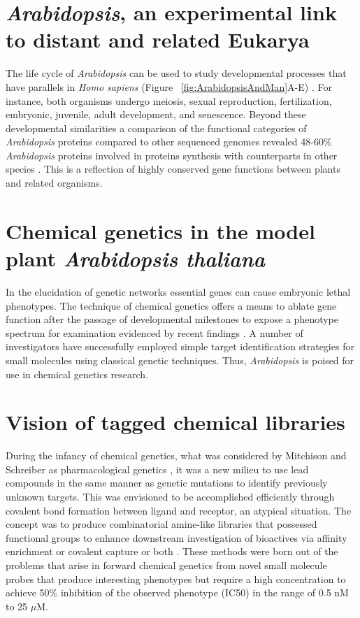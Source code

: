\section{{\it Arabidopsis}, an experimental link to distant and related Eukarya}

The life cycle of {\it Arabidopsis} can be used to study developmental processes that have parallels in {\it Homo sapiens} (Figure ~\ref{fig:ArabidopsisAndMan}A-E) \cite{boyes2001growth}. For instance, both organisms undergo meiosis, sexual reproduction, fertilization, embryonic, juvenile, adult development, and senescence. Beyond these developmental similarities a comparison of the functional categories of {\it Arabidopsis} proteins compared to other sequenced genomes revealed 48-60{\%} {\it Arabidopsis} proteins involved in proteins synthesis with counterparts in other species \cite{primrose2009principles}. This is a reflection of highly conserved gene functions between plants and related organisms. 


\section{Chemical genetics in the model plant {\it Arabidopsis thaliana}}

In the elucidation of genetic networks essential genes can cause embryonic lethal phenotypes.  The technique of chemical genetics offers a means to ablate gene function after the passage of developmental milestones to expose a phenotype spectrum for examination \cite{briggs2006unequal} evidenced by recent findings \cite{park_2009}. A number of investigators have successfully employed simple target identification strategies for small molecules using classical genetic techniques. Thus, {\it Arabidopsis} is poised for use in chemical genetics research.


\section{Vision of tagged chemical libraries}

During the infancy of chemical genetics, what was considered by Mitchison and Schreiber as pharmacological genetics \cite{mitchison1994towards}, it was a new milieu to use lead compounds in the same manner as genetic mutations to identify previously unknown targets. This was envisioned to be accomplished efficiently through covalent bond formation between ligand and receptor, an atypical situation. The concept was to produce combinatorial amine-like libraries that possessed functional groups to enhance downstream investigation of bioactives via affinity enrichment or covalent capture or both \cite{mitchison1994towards}. These methods were born out of the problems that arise in forward chemical genetics from novel small molecule probes that produce interesting phenotypes but require a high concentration to achieve 50{\%} inhibition of the observed phenotype (IC50) in the range of 0.5 nM to 25 $\mu$M. 

